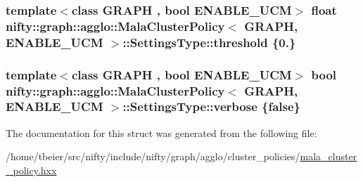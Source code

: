 \subsubsection[{threshold}]{\setlength{\rightskip}{0pt plus 5cm}template$<$class G\+R\+A\+P\+H , bool E\+N\+A\+B\+L\+E\+\_\+\+U\+C\+M$>$ float {\bf nifty\+::graph\+::agglo\+::\+Mala\+Cluster\+Policy}$<$ G\+R\+A\+P\+H, E\+N\+A\+B\+L\+E\+\_\+\+U\+C\+M $>$\+::Settings\+Type\+::threshold \{0.\}}\label{structnifty_1_1graph_1_1agglo_1_1MalaClusterPolicy_1_1SettingsType_a3008e5ea72da713e65c96cea6fb391a5}
\hypertarget{structnifty_1_1graph_1_1agglo_1_1MalaClusterPolicy_1_1SettingsType_a08b914f330c857e63fbff87edb429a2e}{}
\subsubsection[{verbose}]{\setlength{\rightskip}{0pt plus 5cm}template$<$class G\+R\+A\+P\+H , bool E\+N\+A\+B\+L\+E\+\_\+\+U\+C\+M$>$ bool {\bf nifty\+::graph\+::agglo\+::\+Mala\+Cluster\+Policy}$<$ G\+R\+A\+P\+H, E\+N\+A\+B\+L\+E\+\_\+\+U\+C\+M $>$\+::Settings\+Type\+::verbose \{false\}}\label{structnifty_1_1graph_1_1agglo_1_1MalaClusterPolicy_1_1SettingsType_a08b914f330c857e63fbff87edb429a2e}


The documentation for this struct was generated from the following file\+:\begin{DoxyCompactItemize}
\item 
/home/tbeier/src/nifty/include/nifty/graph/agglo/cluster\+\_\+policies/\hyperlink{mala__cluster__policy_8hxx}{mala\+\_\+cluster\+\_\+policy.\+hxx}\end{DoxyCompactItemize}

